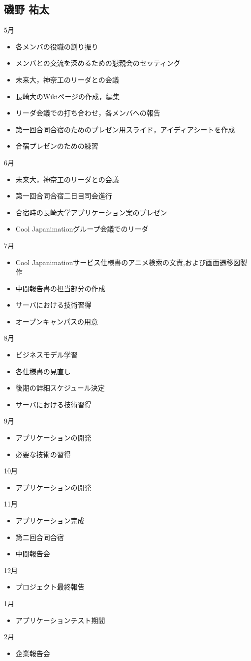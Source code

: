 \subsection{磯野 祐太}
5月
\begin{itemize}
\item 各メンバの役職の割り振り 
\item メンバとの交流を深めるための懇親会のセッティング 
\item 未来大，神奈工のリーダとの会議 
\item 長崎大のWikiページの作成，編集 
\item リーダ会議での打ち合わせ，各メンバへの報告 
\item 第一回合同合宿のためのプレゼン用スライド，アイディアシートを作成 
\item 合宿プレゼンのための練習 
\end{itemize}
6月
\begin{itemize}
\item 未来大，神奈工のリーダとの会議 
\item 第一回合同合宿二日目司会進行 
\item 合宿時の長崎大学アプリケーション案のプレゼン 
\item Cool Japanimationグループ会議でのリーダ 
\end{itemize}
7月
\begin{itemize}
\item Cool Japanimationサービス仕様書のアニメ検索の文責,および画面遷移図製作 
\item 中間報告書の担当部分の作成 
\item サーバにおける技術習得 
\item オープンキャンパスの用意 
\end{itemize}
8月
\begin{itemize}
\item ビジネスモデル学習 
\item 各仕様書の見直し 
\item 後期の詳細スケジュール決定 
\item サーバにおける技術習得 
\end{itemize}
9月
\begin{itemize}
\item アプリケーションの開発 
\item 必要な技術の習得 
\end{itemize}
10月
\begin{itemize} 
\item アプリケーションの開発 
\end{itemize}
11月
\begin{itemize}
\item アプリケーション完成 
\item 第二回合同合宿 
\item 中間報告会
\end{itemize}
12月
\begin{itemize}
\item プロジェクト最終報告
\end{itemize}
1月
\begin{itemize}
\item アプリケーションテスト期間
\end{itemize}
2月
\begin{itemize}
\item 企業報告会
\end{itemize}
